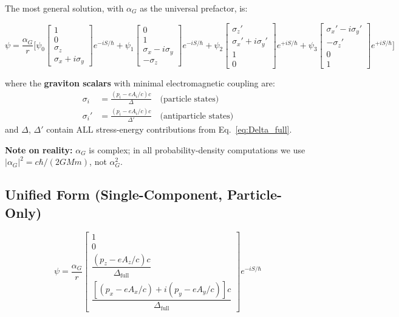 \documentclass[11pt,a4paper]{article}
\theoremstyle{definition}
\theoremstyle{remark}
\begin{document}
	The most general solution, with $\alpha_G$ as the universal prefactor, is:
	
	\begin{equation}
		\psi = \frac{\alpha_G}{r}\Bigg[\psi_0\begin{bmatrix}1\\0\\\sigma_z\\\sigma_x+i\sigma_y\end{bmatrix}e^{-iS/\hbar}
		+ \psi_1\begin{bmatrix}0\\1\\\sigma_x-i\sigma_y\\-\sigma_z\end{bmatrix}e^{-iS/\hbar}
		+ \psi_2\begin{bmatrix}\sigma_z'\\\sigma_x'+i\sigma_y'\\1\\0\end{bmatrix}e^{+iS/\hbar}
		+ \psi_3\begin{bmatrix}\sigma_x'-i\sigma_y'\\-\sigma_z'\\0\\1\end{bmatrix}e^{+iS/\hbar}\Bigg]
		\label{eq:complete_solution}
	\end{equation}
	
	where the \textbf{graviton scalars} with minimal electromagnetic coupling are:
	\begin{align}
		\sigma_i  &= \frac{(p_i - eA_i/c)c}{\Delta}  \quad\text{(particle states)}    \label{eq:sigma}\\
		\sigma_i' &= \frac{(p_i - eA_i/c)c}{\Delta'} \quad\text{(antiparticle states)} \label{eq:sigma_prime}
	\end{align}
	and $\Delta$, $\Delta'$ contain ALL stress-energy contributions from Eq.~\eqref{eq:Delta_full}.
	
	\textbf{Note on reality:}  $\alpha_G$ is complex; in all probability-density computations we use $|\alpha_G|^2 = c\hbar/(2GMm)$, not $\alpha_G^2$.
	
	\subsection{Unified Form (Single-Component, Particle-Only)}
	
	\begin{equation}
		\boxed{
			\psi = \frac{\alpha_G}{r}\begin{bmatrix}
				1 \\ 0 \\
				\dfrac{(p_z-eA_z/c)c}{\Delta_{\mathrm{full}}} \\[6pt]
				\dfrac{[(p_x-eA_x/c)+i(p_y-eA_y/c)]c}{\Delta_{\mathrm{full}}}
			\end{bmatrix}e^{-iS/\hbar}
		}
	\end{equation}
	
\end{document}
